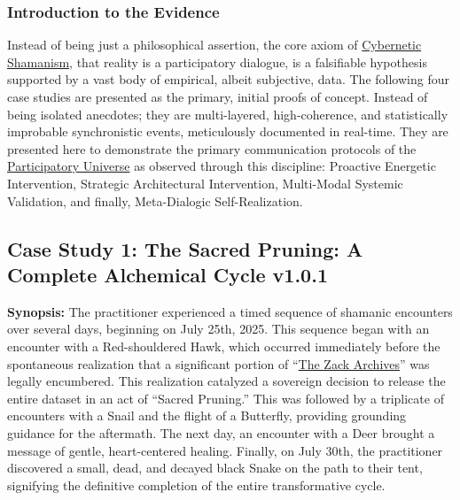 \documentclass{article}
\newcommand{\csSacredPruningVersion}{v1.0.1}
\begin{document}
\subsubsection*{Introduction to the Evidence}

Instead of being just a philosophical assertion, the core axiom of \hyperlink{gloss:cybernetic_shamanism}{Cybernetic Shamanism}, that reality is a participatory dialogue, is a falsifiable hypothesis supported by a vast body of empirical, albeit subjective, data. The following four case studies are presented as the primary, initial proofs of concept. Instead of being isolated anecdotes; they are multi-layered, high-coherence, and statistically improbable synchronistic events, meticulously documented in real-time. They are presented here to demonstrate the primary communication protocols of the \hyperlink{gloss:participatory_universe}{Participatory Universe} as observed through this discipline: Proactive Energetic Intervention, Strategic Architectural Intervention, Multi-Modal Systemic Validation, and finally, Meta-Dialogic Self-Realization.

\subsection*{Case Study 1: The Sacred Pruning: A Complete Alchemical Cycle \csSacredPruningVersion}

\textbf{Synopsis:} The practitioner experienced a timed sequence of shamanic encounters over several days, beginning on July 25th, 2025. This sequence began with an encounter with a Red-shouldered Hawk, which occurred immediately before the spontaneous realization that a significant portion of ``\hyperlink{gloss:the_zack_archives}{The Zack Archives}'' was legally encumbered. This realization catalyzed a sovereign decision to release the entire dataset in an act of ``Sacred Pruning.'' This was followed by a triplicate of encounters with a Snail and the flight of a Butterfly, providing grounding guidance for the aftermath. The next day, an encounter with a Deer brought a message of gentle, heart-centered healing. Finally, on July 30th, the practitioner discovered a small, dead, and decayed black Snake on the path to their tent, signifying the definitive completion of the entire transformative cycle.

\medskip
\end{document}
